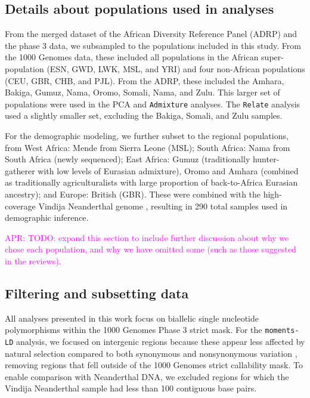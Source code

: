 \documentclass[]{article}
\newcommand{\aprcomment}[1]{{\textcolor{magenta}{APR: #1}}}
\begin{document}
\subsection{Details about populations used in analyses}

From the merged dataset of the African Diversity Reference Panel (ADRP)
\citep{Gurdasani2015-qy,Pagani2015-pz}
and the \citet{1000_Genomes_Project_Consortium2015-zq} phase 3 data,
we subsampled to the populations included in this study. From the 1000 Genomes
data, these included all populations in the African super-population (ESN, GWD,
LWK, MSL, and YRI) and four non-African populations (CEU, GBR, CHB, and PJL).
From the ADRP, these included the Amhara, Bakiga, Gumuz, Nama, Oromo, Somali,
Nama, and Zulu. This larger set of populations were used in the PCA and
\texttt{Admixture} analyses. The \texttt{Relate} analysis used a slightly
smaller set, excluding the Bakiga, Somali, and Zulu samples.

For the demographic modeling, we further subset to the regional populations,
from West Africa: Mende from Sierra Leone (MSL); South Africa: Nama from South
Africa (newly sequenced); East Africa: Gumuz (traditionally hunter-gatherer
with low levels of Eurasian admixture), Oromo and Amhara (combined as
traditionally agriculturalists with large proportion of back-to-Africa Eurasian
ancestry); and Europe: British (GBR). These were combined with the
high-coverage Vindija Neanderthal genome \citep{Prufer2017-kk}, resulting in 290
total samples used in demographic inference.

\aprcomment{TODO: expand this section to include further discussion about why
we chose each population, and why we have omitted some (such as those suggested
in the reviews).}

\subsection{Filtering and subsetting data}

All analyses presented in this work focus on biallelic single nucleotide
polymorphisms within the 1000 Genomes Phase 3 strict mask.  For the
\texttt{moments-LD} analysis, we focused on intergenic regions because these
appear less affected by natural selection compared to both synonymous and
nonsynonymous variation \citep{Ragsdale2018-dd}, removing regions that fell
outside of the 1000 Genomes strict callability mask. To enable comparison with
Neanderthal DNA, we excluded regions for which the Vindija Neanderthal sample
had less than 100 contiguous base pairs.
\end{document}
